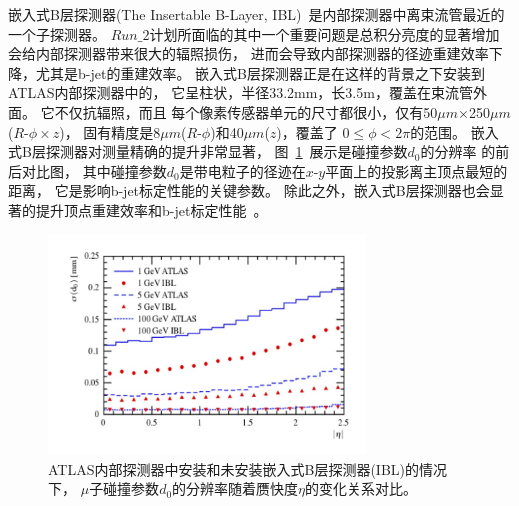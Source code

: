 嵌入式B层探测器(The Insertable B-Layer, IBL)~\cite{ATLASIBL}是内部探测器中离束流管最近的一个子探测器。
$Run\_2$计划所面临的其中一个重要问题是总积分亮度的显著增加会给内部探测器带来很大的辐照损伤，
进而会导致内部探测器的径迹重建效率下降，尤其是b-jet的重建效率。
嵌入式B层探测器正是在这样的背景之下安装到ATLAS内部探测器中的，%
它呈柱状，半径33.2mm，长3.5m，覆盖在束流管外面。
它不仅抗辐照，而且
每个像素传感器单元的尺寸都很小，仅有50$\mu m$×250$\mu m$($R$-$\phi\times z$)，
固有精度是8$\mu m$($R$-$\phi$)和40$\mu m$($z$)，覆盖了
$0\le\phi<2\pi$的范围。
嵌入式B层探测器对测量精确的提升非常显著，
图~\ref{fig:ATLAS8}~展示是碰撞参数$d_0$的分辨率
的前后对比图，
其中碰撞参数$d_0$是带电粒子的径迹在$x$-$y$平面上的投影离主顶点最短的距离，
它是影响b-jet标定性能的关键参数。
除此之外，嵌入式B层探测器也会显著的提升顶点重建效率和b-jet标定性能~\cite{IBLBP}。

\begin{figure}
  \begin{center}
    \includegraphics[width=0.75\textwidth]{figuresEXP/ATLAS8.jpg}
  \end{center}
  \caption{
 ATLAS内部探测器中安装和未安装嵌入式B层探测器(IBL)的情况下，
 $\mu$子碰撞参数$d_0$的分辨率随着赝快度$\eta$的变化关系对比。
  }
    \label{fig:ATLAS8}
\end{figure}

